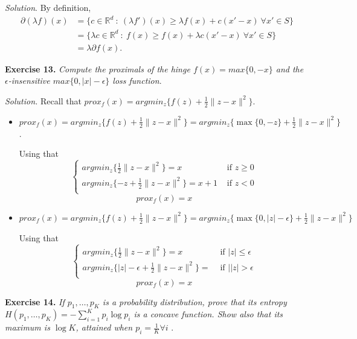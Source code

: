 \documentclass[12pt]{article}
\begin{document}
\emph{Solution}. By definition,
\[
    \begin{aligned}
     \partial(\lambda f)(x) &= \{c \in \mathbb{R}^d \ : \ (\lambda f')(x) \geq \lambda f(x) + c(x' - x)\ \forall x' \in S\}\\
     &= \{\lambda c \in \mathbb{R}^d \ : \  f(x) \geq f(x) + \lambda c(x' - x)\ \forall x' \in S\} \\
     &= \lambda \partial f(x).
    \end{aligned}
\]


\textbf{Exercise 13. }\emph{Compute the proximals of the hinge \( f(x) = max\{0, -x\}  \) and the \( \epsilon \)-insensitive \( max\{0, |x| - \epsilon\} \) loss function}.

\emph{Solution. }Recall that \( prox_f(x) = argmin_z\{f(z) + \frac{1}{2} \|z - x\|^2 \} \).
\begin{itemize}
    \item \( prox_f(x) = argmin_z\{f(z) + \frac{1}{2} \|z - x\|^2 \} = argmin_z\{\max\{0, -z\} + \frac{1}{2} \|z - x\|^2 \} \).

    Using that
        \[
             \begin{cases}
                argmin_z\{\frac{1}{2} \|z - x\|^2 \} = x &\text{ if } z \geq 0\\
                argmin_z\{-z + \frac{1}{2} \|z - x\|^2 \} = x + 1 &\text{ if } z < 0\\
             \end{cases}
        \]
        \[
             prox_f(x) = x
        \]
    \item \( prox_f(x) = argmin_z\{f(z) + \frac{1}{2} \|z - x\|^2 \} = argmin_z\{\max\{0, |z| - \epsilon\} + \frac{1}{2} \|z - x\|^2 \} \)

    Using that
        \[
             \begin{cases}
                argmin_z\{\frac{1}{2} \|z - x\|^2 \} = x &\text{ if } |z| \leq \epsilon\\
                argmin_z\{|z| - \epsilon + \frac{1}{2} \|z - x\|^2 \} =  &\text{ if }   ||z| > \epsilon\\
             \end{cases}
        \]
        \[
             prox_f(x) = x
        \]

\end{itemize}

\textbf{Exercise 14. }\emph{If \( p_1,\dots,p_K \) is a probability distribution, prove that its entropy \( H(p_1, \dots, p_K) = - \sum_{i=1}^K p_i \log p_i\) is a concave function. Show also that its maximum is \( \log K \), attained when \( p_i = \frac{1}{K} \forall i \) }.
\end{document}
